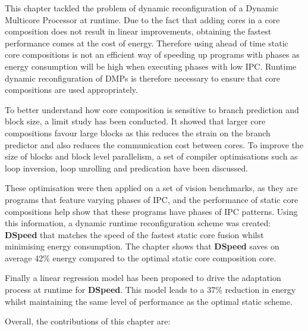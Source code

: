 This chapter tackled the problem of dynamic reconfiguration of a Dynamic Multicore Processor at runtime.
Due to the fact that adding cores in a core composition does not result in linear improvements, obtaining the fastest performance comes at the cost of energy.
Therefore using ahead of time static core compositions is not an efficient way of speeding up programs with phases as energy consumption will be high when executing phases with low IPC. %
Runtime dynamic reconfiguration of DMPs is therefore necessary to ensure that core compositions are used appropriately.

To better understand how core composition is sensitive to branch prediction and block size, a limit study has been conducted.
It showed that larger core compositions favour large blocks as this reduces the strain on the branch predictor and also reduces the communication cost between cores.
To improve the size of blocks and block level parallelism, a set of compiler optimisations such as loop inversion, loop unrolling and predication have been discussed.

These optimisation were then applied on a set of vision benchmarks, as they are programs that feature varying phases of IPC, and the performance of static core compositions help show that these programs have phases of IPC patterns.
Using this information, a dynamic runtime reconfiguration scheme was created:  \textbf{DSpeed} that matches the speed of the fastest static core fusion whilst minimising energy consumption.%
The chapter shows that \textbf{DSpeed} saves on average 42\% energy compared to the optimal static core composition core.%

Finally a linear regression model has been proposed to drive the adaptation process at runtime for \textbf{DSpeed}.
This  model leads to a 37\% reduction in energy whilst maintaining the same level of performance as the optimal static scheme.

Overall, the contributions of this chapter are:

